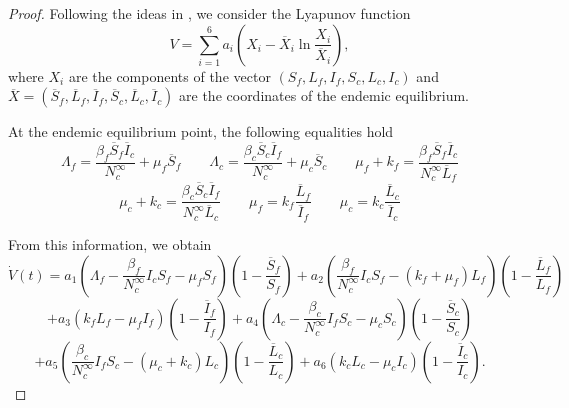\documentclass[preprint, 12pt]{elsarticle}
\begin{document}
\begin{proof}
    Following the ideas in \cite{Zhou:2014}, we consider the Lyapunov function
    $$V=\sum_{i=1}^6a_i\left(X_i-\overline{X}_i\ln{\frac{X_i}{\overline{X}_i}}\right),$$
     where $X_i$ are the components of the vector $(S_f,L_f,I_f,S_c,L_c,I_c)$
     and
     $\overline{X}=(\overline{S}_f,\overline{L}_f,\overline{I}_f,\overline{S}_c,\overline{L}_c,\overline{I}_c)$
     are the coordinates of the endemic equilibrium.

    \noindent At the endemic equilibrium point, the following equalities hold
    $$\Lambda_f=\frac{\beta_f\overline{S}_f\overline{I}_c}{N_c^{\infty}}+\mu_f\overline{S}_f
     \qquad
    \Lambda_c=\frac{\beta_c\overline{S}_c\overline{I}_f}{N_c^{\infty}}+\mu_c\overline{S}_c
     \qquad
    \mu_f+k_f=\frac{\beta_f\overline{S}_f\overline{I}_c}{N_c^{\infty}\overline{L}_f}$$
    \begin{equation}\label{endemic_equalities}
    \mu_c+k_c=\frac{\beta_c\overline{S}_c\overline{I}_f}{N_c^{\infty}\overline{L}_c}
     \qquad \mu_f=k_f\frac{\overline{L}_f}{\overline{I}_f} \qquad \mu_c=
    k_c\frac{\overline{L}_c}{\overline{I}_c}
    \end{equation}

    \noindent From this information, we obtain
    $$\dot{V}(t)=a_1\left(\Lambda_f-\frac{\beta_f}{N_c^{\infty}}I_cS_f-\mu_fS_f\right)\left(1-\frac{\overline{S}_f}{S_f}\right)+a_2\left(\frac{\beta_f}{N_c^{\infty}}I_cS_f-\left(k_f+\mu_f\right)L_f\right)\left(1-\frac{\overline{L}_f}{L_f}\right)$$
    $$+a_3\left(k_f
    L_f-\mu_fI_f\right)\left(1-\frac{\overline{I}_f}{I_f}\right)+a_4\left(\Lambda_c-\frac{\beta_c}{N_c^{\infty}}I_fS_c-\mu_cS_c\right)\left(1-\frac{\overline{S}_c}{S_c}\right)$$
    $$+a_5\left(\frac{\beta_c}{N_c^{\infty}}I_fS_c-\left(\mu_c+k_c\right)L_c\right)\left(1-\frac{\overline{L}_c}{L_c}\right)+a_6\left(k_c
     L_c-\mu_cI_c\right)\left(1-\frac{\overline{I}_c}{I_c}\right).$$


\end{proof}
\end{document}
